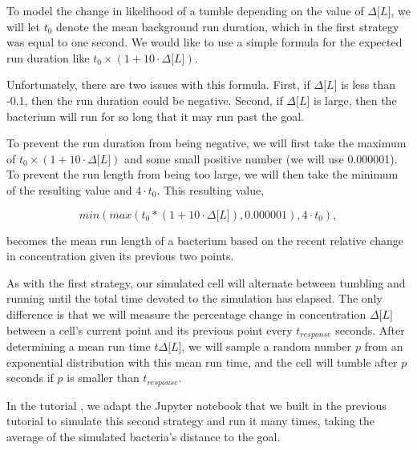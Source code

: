 To model the change in likelihood of a tumble depending on the value of $\Delta\text{[}L{]}$, we will let $t_0$ denote the mean background run duration, which in the first strategy was equal to one second. We would like to use a simple formula for the expected run duration like $t_0 \times (1 + 10 · \Delta\text{[}L{]})$.

Unfortunately, there are two issues with this formula. First, if $\Delta\text{[}L{]}$ is less than -0.1, then the run duration could be negative. Second, if $\Delta\text{[}L{]}$ is large, then the bacterium will run for so long that it may run past the goal.

To prevent the run duration from being negative, we will first take the maximum of $t_0 \times (1 + 10 · \Delta\text{[}L{]})$ and some small positive number (we will use 0.000001). To prevent the run length from being too large, we will then take the minimum of the resulting value and $4 \cdot t_0$. This resulting value,

$$min(max(t_0 * (1 + 10 \cdot \Delta\text{[}L{]}), 0.000001), 4 \cdot t_0),$$

becomes the mean run length of a bacterium based on the recent relative change in concentration given its previous two points.\\

\begin{qbox}\end{qbox}

As with the first strategy, our simulated cell will alternate between tumbling and running until the total time devoted to the simulation has elapsed. The only difference is that we will measure the percentage change in concentration $\Delta\text{[}L{]}$ between a cell's current point and its previous point every $t_{response}$ seconds. After determining a mean run time $t\Delta\text{[}L{]}$, we will sample a random number $p$ from an exponential distribution with this mean run time, and the cell will tumble after $p$ seconds if $p$ is smaller than $t_{response}$.

In the tutorial , we adapt the Jupyter notebook that we built in the previous tutorial to simulate this second strategy and run it many times, taking the average of the simulated bacteria's distance to the goal.

\FloatBarrier
{}
{}
